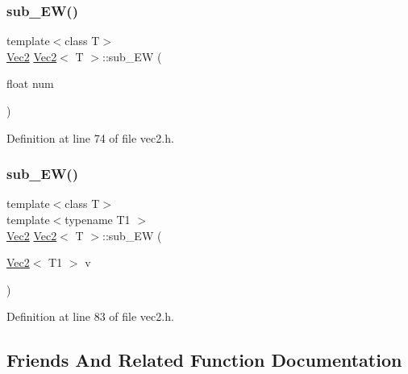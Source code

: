 \subsubsection{\texorpdfstring{sub\_EW()}{sub\_EW()}\hspace{0.1cm}{\footnotesize\ttfamily [1/2]}}
{\footnotesize\ttfamily template$<$class T$>$ \\
\mbox{\hyperlink{class_vec2}{Vec2}} \mbox{\hyperlink{class_vec2}{Vec2}}$<$ T $>$\+::sub\+\_\+\+EW (\begin{DoxyParamCaption}\item[{float}]{num }\end{DoxyParamCaption})\hspace{0.3cm}{\ttfamily [inline]}}



Definition at line 74 of file vec2.\+h.

\mbox{\label{class_vec2_a4f2ac21108c8b2129194b849f1c5418e}} 
\subsubsection{\texorpdfstring{sub\_EW()}{sub\_EW()}\hspace{0.1cm}{\footnotesize\ttfamily [2/2]}}
{\footnotesize\ttfamily template$<$class T$>$ \\
template$<$typename T1 $>$ \\
\mbox{\hyperlink{class_vec2}{Vec2}} \mbox{\hyperlink{class_vec2}{Vec2}}$<$ T $>$\+::sub\+\_\+\+EW (\begin{DoxyParamCaption}\item[{\mbox{\hyperlink{class_vec2}{Vec2}}$<$ T1 $>$}]{v }\end{DoxyParamCaption})\hspace{0.3cm}{\ttfamily [inline]}}



Definition at line 83 of file vec2.\+h.



\subsection{Friends And Related Function Documentation}
\mbox{\label{class_vec2_afb88cb74017eda350b931e105cec40a7}} 
